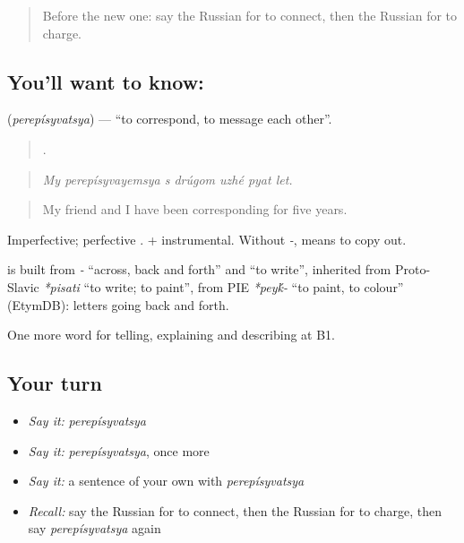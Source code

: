 \label{lesson:RU-C402-perepisyvatsya}



\begin{quote}
Before the new one: say the Russian for to connect, then the Russian for to charge.
\end{quote}

\subsection*{You'll want to know: }
\textbf{} (\emph{perepísyvatsya}) — \textquotedblleft{}to correspond, to message each other\textquotedblright{}.

\begin{quote}
      .
\end{quote}

\begin{quote}
\emph{My perepísyvayemsya s drúgom uzhé pyat let.}
\end{quote}

\begin{quote}
My friend and I have been corresponding for five years.
\end{quote}

Imperfective; perfective \emph{}. \emph{ } + instrumental. Without \emph{-}, \emph{} means to copy out.

\begin{cousinweb}
\textbf{} is built from \emph{-} \textquotedblleft{}across, back and forth\textquotedblright{} and \emph{} \textquotedblleft{}to write\textquotedblright{}, inherited from Proto-Slavic \emph{*pisati} \textquotedblleft{}to write; to paint\textquotedblright{}, from PIE \emph{*pey\'{k}-} \textquotedblleft{}to paint, to colour\textquotedblright{} (EtymDB): letters going back and forth.
\end{cousinweb}

\begin{grammarlens}[title={What you've built}]
One more word for telling, explaining and describing at B1.
\end{grammarlens}

\subsection*{Your turn}
\begin{itemize}
\raggedright
  \item \emph{Say it:} \emph{perepísyvatsya}
  \item \emph{Say it:} \emph{perepísyvatsya}, once more
  \item \emph{Say it:} a sentence of your own with \emph{perepísyvatsya}
  \item \emph{Recall:} say the Russian for to connect, then the Russian for to charge, then say \emph{perepísyvatsya} again
\end{itemize}


